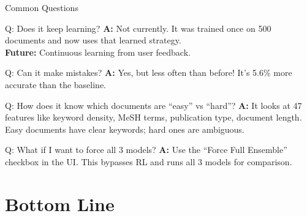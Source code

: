 \documentclass[aspectratio=169]{beamer}
\begin{document}
\begin{frame}{Common Questions \faQuestionCircle}
\begin{block}{Q: Does it keep learning?}
\textbf{A:} Not currently. It was trained once on 500 documents and now uses that learned strategy. \\
\textbf{Future:} Continuous learning from user feedback.
\end{block}

\vspace{0.3cm}

\begin{block}{Q: Can it make mistakes?}
\textbf{A:} Yes, but less often than before! It's 5.6\% more accurate than the baseline.
\end{block}

\vspace{0.3cm}

\begin{block}{Q: How does it know which documents are ``easy'' vs ``hard''?}
\textbf{A:} It looks at 47 features like keyword density, MeSH terms, publication type, document length. Easy documents have clear keywords; hard ones are ambiguous.
\end{block}

\vspace{0.3cm}

\begin{block}{Q: What if I want to force all 3 models?}
\textbf{A:} Use the ``Force Full Ensemble'' checkbox in the UI. This bypasses RL and runs all 3 models for comparison.
\end{block}
\end{frame}

\section{Bottom Line}
\end{document}
